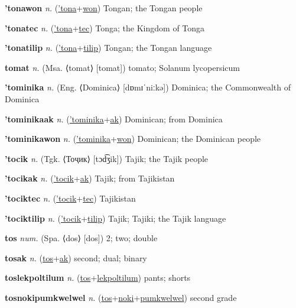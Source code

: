 \textbf{\hypertarget{'tonawon}{'tonawon}} \textit{n.} (\hyperlink{'tona}{'tona}+\allowbreak \hyperlink{won}{won})
Tongan; the Tongan people

\textbf{\hypertarget{'tonatec}{'tonatec}} \textit{n.} (\hyperlink{'tona}{'tona}+\allowbreak \hyperlink{tec}{tec})
Tonga; the Kingdom of Tonga

\textbf{\hypertarget{'tonatilip}{'tonatilip}} \textit{n.} (\hyperlink{'tona}{'tona}+\allowbreak \hyperlink{tilip}{tilip})
Tongan; the Tongan language

\textbf{\hypertarget{tomat}{tomat}} \textit{n.} (Msa. ⟨tomat⟩ [tomat])
tomato; Solanum lycopersicum

\textbf{\hypertarget{'tominika}{'tominika}} \textit{n.} (Eng. ⟨Dominica⟩ [dɒmɪˈniːkə])
Dominica; the Commonwealth of Dominica

\textbf{\hypertarget{'tominikaak}{'tominikaak}} \textit{n.} (\hyperlink{'tominika}{'tominika}+\allowbreak \hyperlink{ak}{ak})
Dominican; from Dominica

\textbf{\hypertarget{'tominikawon}{'tominikawon}} \textit{n.} (\hyperlink{'tominika}{'tominika}+\allowbreak \hyperlink{won}{won})
Dominican; the Dominican people

\textbf{\hypertarget{'tocik}{'tocik}} \textit{n.} (Tgk. ⟨Тоҷик⟩ [tɔd͡ʒik])
Tajik; the Tajik people

\textbf{\hypertarget{'tocikak}{'tocikak}} \textit{n.} (\hyperlink{'tocik}{'tocik}+\allowbreak \hyperlink{ak}{ak})
Tajik; from Tajikistan

\textbf{\hypertarget{'tociktec}{'tociktec}} \textit{n.} (\hyperlink{'tocik}{'tocik}+\allowbreak \hyperlink{tec}{tec})
Tajikistan

\textbf{\hypertarget{'tociktilip}{'tociktilip}} \textit{n.} (\hyperlink{'tocik}{'tocik}+\allowbreak \hyperlink{tilip}{tilip})
Tajik; Tajiki; the Tajik language

\textbf{\hypertarget{tos}{tos}} \textit{num.} (Spa. ⟨dos⟩ [dos])
2; two; double

\textbf{\hypertarget{tosak}{tosak}} \textit{n.} (\hyperlink{tos}{tos}+\allowbreak \hyperlink{ak}{ak})
second; dual; binary

\textbf{\hypertarget{toslekpoltilum}{toslekpoltilum}} \textit{n.} (\hyperlink{tos}{tos}+\allowbreak \hyperlink{lekpoltilum}{lekpoltilum})
pants; shorts

\textbf{\hypertarget{tosnokipumkwelwel}{tosnokipumkwelwel}} \textit{n.} (\hyperlink{tos}{tos}+\allowbreak \hyperlink{noki}{noki}+\allowbreak \hyperlink{pumkwelwel}{pumkwelwel})
second grade

